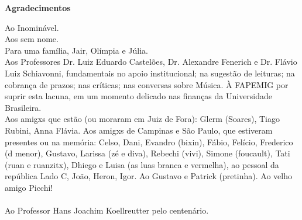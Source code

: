 \newpage
\begin{flushright}
\huge{\textbf{Agradecimentos}}

\small{Ao Inominável.
\ \\
Aos sem nome.
\ \\
Para uma família, Jair, Olímpia e Júlia. 
\ \\
Aos Professores Dr. Luiz Eduardo Castelões, Dr. Alexandre Fenerich e Dr. Flávio Luiz Schiavonni, fundamentais no apoio institucional; na sugestão de leituras; na cobrança de prazos; nas críticas; nas conversas sobre Música. À FAPEMIG por suprir esta lacuna, em um momento delicado nas finanças da Universidade Brasileira.
\ \\
Aos amigxs que estão (ou moraram em Juiz de Fora): Glerm (Soares), Tiago Rubini, Anna Flávia. Aos amigxs de Campinas e São Paulo, que estiveram presentes ou na memória: Celso, Dani, Evandro (bixin), Fábio, Felício, Frederico (d menor), Gustavo, Larissa (zé e diva), Rebechi (vivi), Simone (foucault), Tati (ruan e ruanzitx), Dhiego e Luisa (as luas branca e vermelha), ao pessoal da república Lado C, João, Heron, Igor.  Ao Gustavo e Patrick (pretinha). Ao velho amigo Picchi!
\ \\
\ \\
Ao Professor Hans Joachim Koellreutter pelo centenário.}
\end{flushright}

\vfil \ 

\newpage